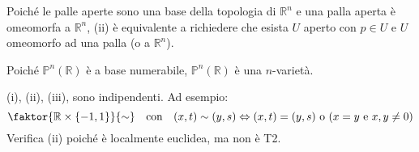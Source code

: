 \begin{oss}
Poiché le palle aperte sono una base della topologia di $\mathbb{R}^n$ e una palla aperta è omeomorfa a $\mathbb{R}^n$, (ii) è equivalente a richiedere che esista $U$ aperto con $p \in U$ e $U$ omeomorfo ad una palla (o a $\mathbb{R}^n$).
\end{oss}

\begin{oss}
Poiché $\mathbb{P}^n(\mathbb{R})$ è a base numerabile, $\mathbb{P}^n(\mathbb{R})$ è una $n$-varietà.
\end{oss}

\begin{oss}
(i), (ii), (iii), sono indipendenti. Ad esempio:
$$\faktor{\mathbb{R} \times \{-1,1\}}{\sim} \quad \text{con} \quad (x,t) \sim (y,s) \Leftrightarrow (x,t)=(y,s) \text{ o } (x=y \text{ e }x,y \neq 0)$$
Verifica (ii) poiché è localmente euclidea, ma non è T2.
\end{oss}